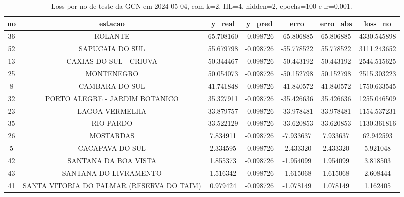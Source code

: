 \begin{table}[h]
\centering
\caption{Loss por no de teste da GCN em 2024-05-04, com k=2, HL=4, hidden=2, epochs=100 e lr=0.001.}
\label{tab:gcn_loss_k2_hl4_h2_e100_d20240504}
\begin{tabular}{ccccccc}
\toprule
no & estacao & y\_real & y\_pred & erro & erro\_abs & loss\_no \\
\midrule
36 & ROLANTE & 65.708160 & -0.098726 & -65.806885 & 65.806885 & 4330.545898 \\
52 & SAPUCAIA DO SUL & 55.679798 & -0.098726 & -55.778522 & 55.778522 & 3111.243652 \\
13 & CAXIAS DO SUL - CRIUVA & 50.344467 & -0.098726 & -50.443192 & 50.443192 & 2544.515625 \\
25 & MONTENEGRO & 50.054073 & -0.098726 & -50.152798 & 50.152798 & 2515.303223 \\
8 & CAMBARA DO SUL & 41.741848 & -0.098726 & -41.840572 & 41.840572 & 1750.633545 \\
32 & PORTO ALEGRE - JARDIM BOTANICO & 35.327911 & -0.098726 & -35.426636 & 35.426636 & 1255.046509 \\
23 & LAGOA VERMELHA & 33.879757 & -0.098726 & -33.978481 & 33.978481 & 1154.537231 \\
35 & RIO PARDO & 33.522129 & -0.098726 & -33.620853 & 33.620853 & 1130.361816 \\
26 & MOSTARDAS & 7.834911 & -0.098726 & -7.933637 & 7.933637 & 62.942593 \\
5 & CACAPAVA DO SUL & 2.334595 & -0.098726 & -2.433320 & 2.433320 & 5.921048 \\
42 & SANTANA DA BOA VISTA & 1.855373 & -0.098726 & -1.954099 & 1.954099 & 3.818503 \\
43 & SANTANA DO LIVRAMENTO & 1.516342 & -0.098726 & -1.615068 & 1.615068 & 2.608444 \\
41 & SANTA VITORIA DO PALMAR (RESERVA DO TAIM) & 0.979424 & -0.098726 & -1.078149 & 1.078149 & 1.162405 \\
\bottomrule
\end{tabular}
\end{table}
